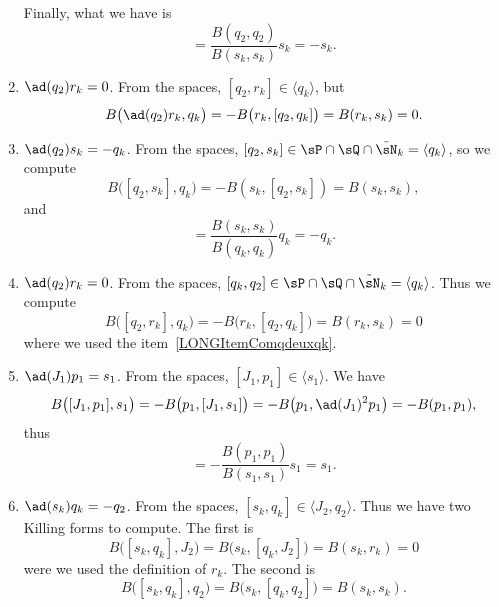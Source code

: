 \begin{enumerate}
\begin{equation}
	\end{equation}
	Finally, what we have is
	\begin{equation}
		[q_2,q_k]=\frac{ B(q_2,q_2) }{ B(s_k,s_k) }s_k=-s_k.
	\end{equation}
	\item$\ad(q_2)r_k=0$. From the spaces, $[q_2,r_k]\in\langle q_k\rangle$, but
	\begin{equation}
		B\big( \ad(q_2)r_k,q_k \big)=-B\big( r_k,[q_2,q_k] \big)=B(r_k,s_k)=0.
	\end{equation}
	\item$\ad(q_2)s_k=-q_k$. From the spaces, $[q_2,s_k]\in\sP\cap\sQ\cap\tilde\sN_k=\langle q_k\rangle$, so we compute
	\begin{equation}
		B\big( [q_2,s_k],q_k \big)=-B(s_k,[q_2,s_k])=B(s_k,s_k),
	\end{equation}
	and
	\begin{equation}
		[q_2,s_k]=\frac{ B(s_k,s_k) }{ B(q_k,q_k) }q_k=-q_k.
	\end{equation}
	\item$\ad(q_2)r_k=0$. From the spaces, $[q_k,q_2]\in\sP\cap\sQ\cap\tilde\sN_k=\langle q_k\rangle$. Thus we compute
	\begin{equation}
		B\big( [q_2,r_k],q_k \big)=-B\big( r_k,[q_2,q_k] \big)=B(r_k,s_k)=0
	\end{equation}
	where we used the item~\ref{LONGItemComqdeuxqk}.
	\item\label{LONGItemComjunpun}$\ad(J_1)p_1=s_1$. From the spaces, $[J_1,p_1]\in\langle s_1\rangle$. We have
	\begin{equation}
		B\big( [J_1,p_1],s_1 \big)=-B\big( p_1,[J_1,s_1] \big)=-B\big( p_1,\ad(J_1)^2p_1 \big)=-B(p_1,p_1),
	\end{equation}
	thus
	\begin{equation}
		[J_1,p_1]=-\frac{ B(p_1,p_1) }{ B(s_1,s_1) }s_1=s_1.
	\end{equation}
	\item\label{LONGItemComskqk}$\ad(s_k)q_k=-q_2$. From the spaces, $[s_k,q_k]\in\langle J_2,q_2\rangle$. Thus we have two Killing forms to compute. The first is
	\begin{equation}
		B\big( [s_k,q_k],J_2 \big)=B\big( s_k,[q_k,J_2] \big)=B(s_k,r_k)=0
	\end{equation}
	were we used the definition of $r_k$. The second is
	\begin{equation}
		B\big( [s_k,q_k],q_2 \big)=B\big( s_k,[q_k,q_2] \big)=B(s_k,s_k).
	\end{equation}

\end{enumerate}
